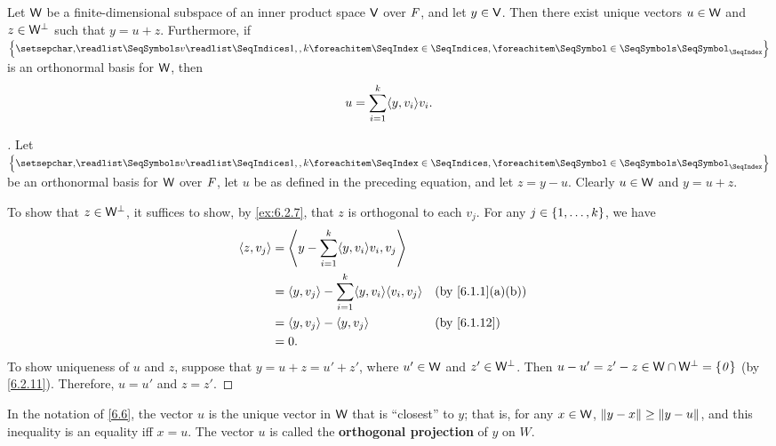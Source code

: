 \begin{thm}\label{6.6}
  Let \(\mathsf{W}\) be a finite-dimensional subspace of an inner product space \(\mathsf{V}\) over \(\mathit{F}\), and let \(y \in \mathsf{V}\).
  Then there exist unique vectors \(u \in \mathsf{W}\) and \(z \in \mathsf{W}^{\perp}\) such that \(y = u + z\).
  Furthermore, if \(\set{\seq{v}{1,,k}}\) is an orthonormal basis for \(\mathsf{W}\), then
  \[
    u = \sum_{i = 1}^k \inn{y, v_i} v_i.
  \]
\end{thm}

\begin{proof}[]
  Let \(\set{\seq{v}{1,,k}}\) be an orthonormal basis for \(\mathsf{W}\) over \(\mathit{F}\), let \(u\) be as defined in the preceding equation, and let \(z = y - u\).
  Clearly \(u \in \mathsf{W}\) and \(y = u + z\).

  To show that \(z \in \mathsf{W}^{\perp}\), it suffices to show, by \cref{ex:6.2.7}, that \(z\) is orthogonal to each \(v_j\).
  For any \(j \in \left\lbrace1, \dots, k\right\rbrace\), we have
  \begin{align*}
    \inn{z, v_j} & = \inn{y - \sum_{i = 1}^k \inn{y, v_i} v_i, v_j}                                                \\
                 & = \inn{y, v_j} - \sum_{i = 1}^k \inn{y, v_i} \inn{v_i, v_j} &  & \text{(by \cref{6.1.1}(a)(b))} \\
                 & = \inn{y, v_j} - \inn{y, v_j}                               &  & \text{(by \cref{6.1.12})}      \\
                 & = 0.
  \end{align*}
  To show uniqueness of \(u\) and \(z\), suppose that \(y = u + z = u' + z'\), where \(u' \in \mathsf{W}\) and \(z' \in \mathsf{W}^{\perp}\).
  Then \(u - u' = z' - z \in \mathsf{W} \cap \mathsf{W}^{\perp} = \left\lbrace\mathit{0}\right\rbrace\) (by \cref{6.2.11}).
  Therefore, \(u = u'\) and \(z = z'\).
\end{proof}

\begin{cor}\label{6.2.12}
  In the notation of \cref{6.6}, the vector \(u\) is the unique vector in \(\mathsf{W}\) that is ``closest'' to \(y\);
  that is, for any \(x \in \mathsf{W}\), \(\left\lVert y - x\right\rVert \geq \left\lVert y - u\right\rVert\), and this inequality is an equality iff \(x = u\).
  The vector \(u\) is called the \textbf{orthogonal projection} of \(y\) on \(W\).
\end{cor}

